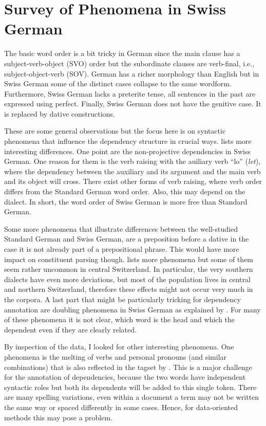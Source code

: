 \documentclass[11pt,letterpaper, covington]{article}
\begin{document}
\section{Survey of Phenomena in Swiss German}

The basic word order is a bit tricky in German since the main clause has a subject-verb-object (SVO) order but the subordinate clauses are verb-final, i.e., subject-object-verb (SOV). German has a richer morphology than English but in Swiss German some of the distinct cases collapse to the same wordform. Furthermore, Swiss German lacks a preterite tense, all sentences in the past are expressed using perfect. Finally, Swiss German does not have the genitive case. It is replaced by dative constructions. \citep{Scherrer11}

These are some general observations but the focus here is on syntactic phenomena that influence the dependency structure in crucial ways. \citet{Scherrer11} lists more interesting differences. One point are the non-projective dependencies in Swiss German. One reason for them is the verb raising with the auiliary verb ``lo'' (\emph{let}), where the dependency between the auxiliary and its argument and the main verb and its object will cross. There exist other forms of verb raising, where verb order differs from the Standard German word order. Also, this may depend on the dialect. In short, the word order of Swiss German is more free than Standard German. 

Some more phenomena that illustrate differences between the well-studied Standard German and Swiss German, are a preposition before a dative in the case it is not already part of a prepositional phrase. This would have more impact on constituent parsing though. \citet{Scherrer11} lists more phenomena but some of them seem rather uncommon in central Switzerland. In particular, the very southern dialects have even more deviations, but most of the population lives in central and northern Switzerland, therefore these effects might not occur very much in the corpora. A last part that might be particularly tricking for dependency annotation are doubling phenomena in Swiss German as explained by \citet{GF06}. For many of these phenomena it is not clear, which word is the head and which the dependent even if they are clearly related.

By inspection of the data, I looked for other interesting phenomena. One phenomena is the melting of verbs and personal pronouns (and similar combinations) that is also reflected in the tagset by \citet{AH12}. This is a major challenge for the annotation of dependencies, because the two words have independent syntactic roles but both its dependents will be added to this single token. There are many spelling variations, even within a document a term may not be written the same way or spaced differently in some cases. Hence, for data-oriented methods this may pose a problem. 
\end{document}
